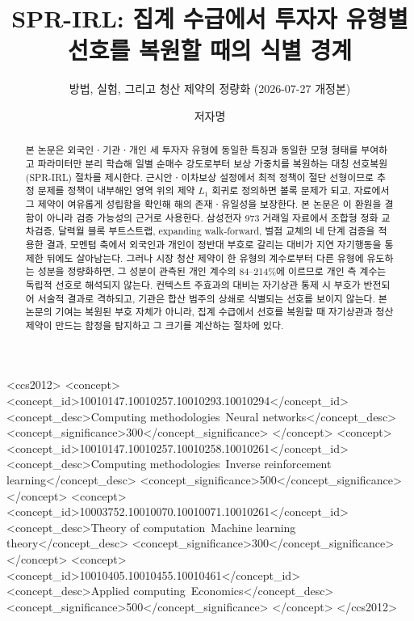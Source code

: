 \documentclass[sigconf,nonacm]{acmart}
\theoremstyle{acmplain}
\begin{document}
\title{SPR-IRL: 집계 수급에서 투자자 유형별 선호를 복원할 때의 식별 경계}
\subtitle{방법, 실험, 그리고 청산 제약의 정량화 (2026-07-27 개정본)}

\author{저자명}
\renewcommand{\shortauthors}{저자명}

\begin{abstract}
본 논문은 외국인ㆍ기관ㆍ개인 세 투자자 유형에 동일한 특징과 동일한 모형 형태를
부여하고 파라미터만 분리 학습해 일별 순매수 강도로부터 보상 가중치를 복원하는
대칭 선호복원(SPR-IRL) 절차를 제시한다. 근시안ㆍ이차보상 설정에서 최적 정책이 절단
선형이므로 추정 문제를 정책이 내부해인 영역 위의 제약 $L_1$ 회귀로 정의하면 볼록 문제가
되고, 자료에서 그 제약이 여유롭게 성립함을 확인해 해의 존재ㆍ유일성을 보장한다. 본 논문은
이 환원을 결함이 아니라 검증 가능성의 근거로 사용한다. 삼성전자 973 거래일 자료에서 조합형
정화 교차검증, 달력월 블록 부트스트랩, expanding walk-forward, 벌점 교체의 네 단계
검증을 적용한 결과, 모멘텀 축에서 외국인과 개인이 정반대 부호로 갈리는 대비가
지연 자기행동을 통제한 뒤에도 살아남는다. 그러나 시장 청산 제약이 한 유형의 계수로부터
다른 유형에 유도하는 성분을 정량화하면, 그 성분이 관측된 개인 계수의 84--214\%에
이르므로 개인 측 계수는 독립적 선호로 해석되지 않는다. 컨텍스트 주효과의 대비는
자기상관 통제 시 부호가 반전되어 서술적 결과로 격하되고, 기관은 합산 범주의 상쇄로
식별되는 선호를 보이지 않는다. 본 논문의 기여는 복원된 부호 자체가 아니라, 집계
수급에서 선호를 복원할 때 자기상관과 청산 제약이 만드는 함정을 탐지하고 그 크기를
계산하는 절차에 있다.
\end{abstract}

\begin{CCSXML}
<ccs2012>
<concept>
<concept_id>10010147.10010257.10010293.10010294</concept_id>
<concept_desc>Computing methodologies~Neural networks</concept_desc>
<concept_significance>300</concept_significance>
</concept>
<concept>
<concept_id>10010147.10010257.10010258.10010261</concept_id>
<concept_desc>Computing methodologies~Inverse reinforcement learning</concept_desc>
<concept_significance>500</concept_significance>
</concept>
<concept>
<concept_id>10003752.10010070.10010071.10010261</concept_id>
<concept_desc>Theory of computation~Machine learning theory</concept_desc>
<concept_significance>300</concept_significance>
</concept>
<concept>
<concept_id>10010405.10010455.10010461</concept_id>
<concept_desc>Applied computing~Economics</concept_desc>
<concept_significance>500</concept_significance>
</concept>
</ccs2012>
\end{CCSXML}
\end{document}
